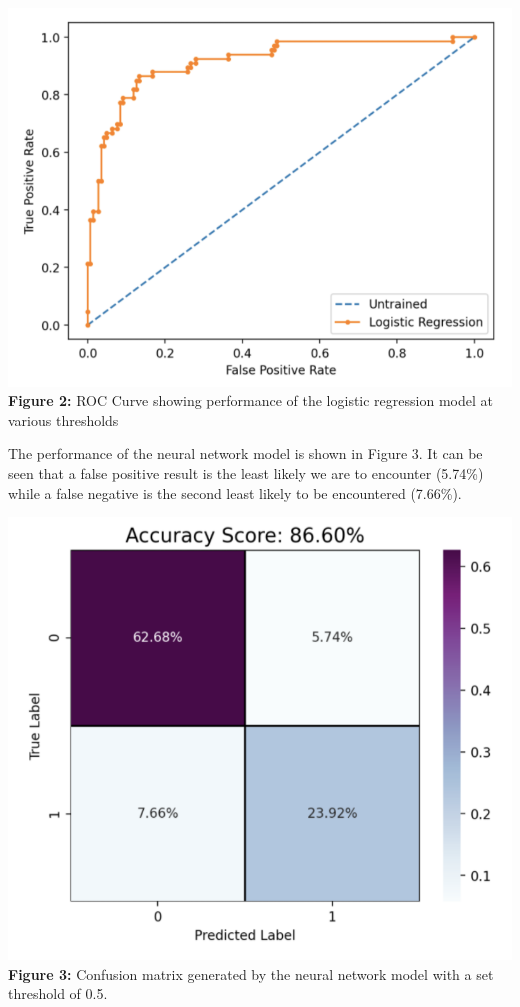 \documentclass{article}
\begin{document}
 \begin{center}
 \includegraphics[scale=.65]{figure2.png}\\
 \textbf{Figure 2:} ROC Curve showing performance of the logistic regression model at various thresholds
\end{center}

\par The performance of the neural network model is shown in Figure 3. It can be seen that a false positive result is the least likely we are to encounter (5.74\%) while a false negative is the second least likely to be encountered (7.66\%).

\begin{center}
\includegraphics[scale=.65]{figure3.png}\\
\textbf{Figure 3:} Confusion matrix generated by the neural network model with a set threshold of 0.5.
\end{center}
\end{document}
